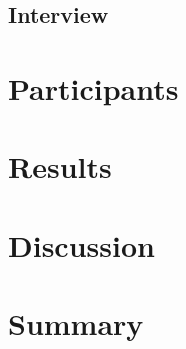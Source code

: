 \subsection{Interview}

\section{Participants}



\section{Results}

\section{Discussion}

\section{Summary}
